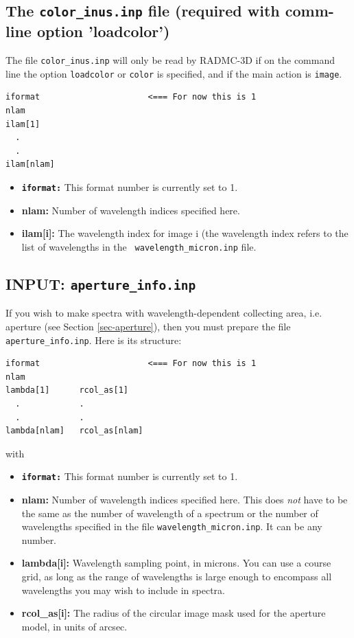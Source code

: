 \documentclass{report}
\newenvironment{asciibox}%
  {\begin{list}{}{%
    \setlength{\topsep}{0.5em}%
    \setlength{\parskip}{0em}%
    \setlength{\parsep}{0em}%
    \setlength{\itemsep}{0em}%
    \setlength{\rightmargin}{0em}%
    \setlength{\leftmargin}{3.0em}%
    \setlength{\labelsep}{1em}%
    \setlength{\labelwidth}{2em}%
  }\normalfont\footnotesize\item}
  {\end{list}}
\begin{document}
\subsection{The {\small\tt color\_inus.inp} file (required with comm-line option 'loadcolor')}
\label{sec-color-inus}
The file {\small\tt color\_inus.inp} will only be read by RADMC-3D if on the
command line the option {\small\tt loadcolor} or {\small\tt color} is
specified, and if the main action is {\small\tt image}.
\begin{asciibox}\begin{verbatim}
iformat                      <=== For now this is 1
nlam
ilam[1]
  .
  .
ilam[nlam]
\end{verbatim}\end{asciibox}
\begin{itemize}
\item[] {\small\tt\bf iformat:} This format number is currently set to 1.
\item[] {\bf\bf nlam:} Number of wavelength indices specified here.
\item[] {\bf\bf ilam[i]:} The wavelength index for image i (the wavelength
  index refers to the list of wavelengths in the {\small\tt
    wavelength\_micron.inp} file.
\end{itemize}


\subsection{INPUT: {\small\tt aperture\_info.inp}}
\label{sec-aperture-info-file}
%
If you wish to make spectra with wavelength-dependent collecting area, i.e.
aperture (see Section \ref{sec-aperture}), then you must prepare the
file {\small\tt aperture\_info.inp}. Here is its structure:
\begin{asciibox}\begin{verbatim}
iformat                      <=== For now this is 1
nlam
lambda[1]      rcol_as[1]
  .            .
  .            .
lambda[nlam]   rcol_as[nlam]
\end{verbatim}\end{asciibox}
with
\begin{itemize}
\item[] {\small\tt\bf iformat:} This format number is currently set to 1.
\item[] {\bf nlam:} Number of wavelength indices specified here. This
  does {\em not} have to be the same as the number of wavelength of a
  spectrum or the number of wavelengths specified in the file
  {\small\tt wavelength\_micron.inp}. It can be any number. 
\item[] {\bf lambda[i]:} Wavelength sampling point, in microns. You can use
  a course grid, as long as the range of wavelengths is large enough to
  encompass all wavelengths you may wish to include in spectra.
\item[] {\bf rcol\_as[i]:} The radius of the circular image mask used for
  the aperture model, in units of arcsec.
\end{itemize}
\end{document}
